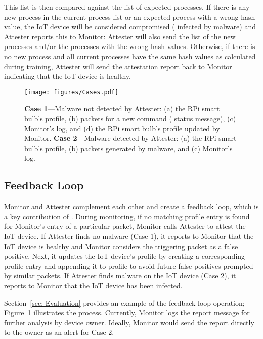 This list is then compared against the list of expected processes. If there is any new process in the current process list or an expected process with a wrong hash value, the IoT device will be considered compromised (\ie{} infected by malware) and Attester reports this to Monitor: Attester will also send the list of the new processes and/or the processes with the wrong hash values. 
Otherwise, if there is no new process and all current processes have the same hash values as calculated during training, Attester will send the attestation report back to Monitor indicating that the IoT device is healthy.

\begin{figure}
    \centering
    \texttt{[image: figures/Cases.pdf]}
    \caption{\textbf{Case 1}---Malware not detected by Attester:
    (a) the RPi smart bulb's profile, (b) packets for a new command (\ie{} status message), (c) Monitor's log, and (d) the RPi smart bulb's profile updated by Monitor. \textbf{Case 2}---Malware detected by Attester: (a) the RPi smart bulb's profile, (b) packets generated by malware, and (c) Monitor's log.}
    \label{fig: positive feedback}
\end{figure}

\subsection{Feedback Loop}\label{subsec:feedback-loop}
Monitor and Attester complement each other and create a feedback loop, which is a key contribution of \system{}.
During monitoring, if no matching profile entry is found for Monitor's entry of a particular packet, Monitor calls Attester to attest the IoT device. If Attester finds no malware (Case 1), it reports to Monitor that the IoT device is healthy and Monitor considers the triggering packet as a false positive. Next, it updates the IoT device's profile by creating a corresponding profile entry and appending it to profile to avoid future false positives prompted by similar packets. If Attester finds malware on the IoT device (Case 2), it reports to Monitor that the IoT device has been infected.  

Section~\ref{sec: Evaluation} provides an example of the feedback loop operation; Figure~\ref{fig: positive feedback} illustrates the process. Currently, Monitor logs the report message for further analysis by device owner. Ideally, Monitor would send the report directly to the owner as an alert for Case 2.